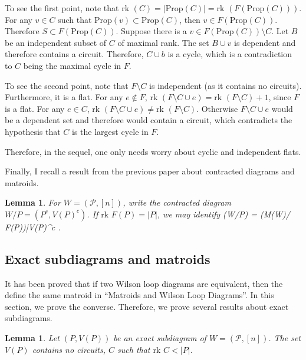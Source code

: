 \documentclass[11pt]{article}
\newcommand{\rk}{\textrm{rk }}
\def\bas #1\eas{\begin{align*} #1 \end{align*}}
\newcommand{\cP}{\mathcal{P}}
\newcommand{\Prop}{\textrm{Prop}}
\newtheorem{lem}[thm]{Lemma}
\theoremstyle{remark}
\theoremstyle{definition}
\begin{document}
To see the first point, note that $\rk(C) = |\Prop(C)|= \rk (F(\Prop(C)))$. For any $v\in C$ such that $\Prop(v) \subset \Prop(C)$, then $v \in F(\Prop(C))$. Therefore $S \subset F(\Prop(C))$. Suppose there is a $v \in  F(\Prop(C)) \setminus C$. Let $B$ be an independent subset of $C$ of maximal rank. The set $B \cup v$ is dependent and therefore contains a circuit. Therefore, $C \cup b$ is a cycle, which is a contradiction to $C$ being the maximal cycle in $F$.

To see the second point, note that $F \setminus C$ is independent (as it contains no circuits). Furthermore, it is a flat. For any $e \not \in F$, $\rk (F \setminus C \cup e) = \rk (F\setminus C) +1$, since $F$ is a flat. For any $e \in C$,  $\rk (F \setminus C \cup e) \neq \rk (F\setminus C)$. Otherwise $F\setminus C \cup e$ would be a dependent set and therefore would contain a circuit, which contradicts the hypothesis that $C$ is the largest cycle in $F$.

Therefore, in the sequel, one only needs worry about cyclic and independent flats.

Finally, I recall a result from the previous paper about contracted diagrams and matroids.

\begin{lem}
For $W = (\cP, [n])$, write the contracted diagram $W/P = (P^c, V(P)^c)$. If $\rk F(P) = |P|$, we may identify \bas M(W/P) = \left(M(W)/ F(P)\right)|V(P)^c \;. \eas
\end{lem}

\subsection{Exact subdiagrams and matroids}

It has been proved that if two Wilson loop diagrams are equivalent, then the define the same matroid in ``Matroids and Wilson Loop Diagrams''. In this section, we prove the converse. Therefore, we prove several results about exact subdiagrams.


\begin{lem} \label{exactcircuitlem}
Let $(P, V(P))$ be an exact subdiagram of $W= (\cP, [n])$. The set $V(P)$ contains no circuits, $C$ such that  $\rk C< |P|$.
\end{lem}
\end{document}
